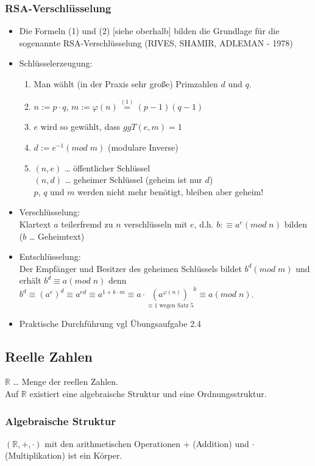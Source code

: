 \subsubsection*{RSA-Verschlüsselung}
\begin{itemize}
\item Die Formeln (1) und (2) [siehe oberhalb] bilden die Grundlage für die sogenannte RSA-Ver\-schlüsselung (RIVES, SHAMIR, ADLEMAN - 1978)
\item Schlüsselerzeugung:
\begin{enumerate}
\item Man wählt (in der Praxis sehr große) Primzahlen $d$ und $q$.
\item $n:= p \cdot q$, $m:= \varphi (n) \overset{(1)}{=} (p-1)(q-1)$
\item $e$ wird so gewählt, dass $ggT(e,m)=1$
\item $d:= e^{-1} (mod \; m)$ (modulare Inverse)
\item $(n,e)$ … öffentlicher Schlüssel\\
$(n,d)$ … geheimer Schlüssel (geheim ist nur $d$)\\
$p$, $q$ und $m$ werden nicht mehr benötigt, bleiben aber geheim!
\end{enumerate}
\item Verschlüsselung: \\
Klartext $a$ teilerfremd zu $n$ verschlüsseln mit $e$, d.h. $b:\equiv a^e (mod \; n)$ bilden ($b$ … Geheimtext)
\item Entschlüsselung: \\
Der Empfänger und Besitzer des geheimen Schlüssels bildet $b^d (mod \; m)$ und erhält $b^d\equiv a (mod \; n)$ denn $b^d\equiv (a^e)^d \equiv a^{ed}\equiv a ^{1+k\cdot m}\equiv a\cdot \underset{\equiv 1 \text{ wegen Satz 5}}{\left( a^{\varphi(n)}\right)}^k\equiv a (mod \; n)$.
\item Praktische Durchführung vgl Übungsaufgabe 2.4
\end{itemize}

\subsection{Reelle Zahlen}

$\mathbb{R}$ … Menge der reellen Zahlen.\\
Auf $\mathbb{R}$ existiert eine algebraische Struktur und eine Ordnungsstruktur.

\subsubsection{Algebraische Struktur}
$(\mathbb{R}, + ,\cdot)$ mit den arithmetischen Operationen $+$ (Addition) und $\cdot$ (Multiplikation) ist ein Körper.
